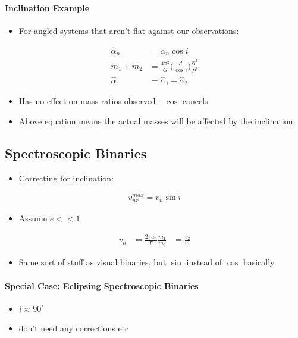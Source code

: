 \documentclass[a4paper,11pt,normalem]{article}
\begin{document}
\paragraph{Inclination Example}
\begin{itemize}
    \item For angled systems that aren't flat against our observations:
\end{itemize}
\begin{align}
    \hat{\alpha}_n &= \alpha_n \cos i\\
    m_1 + m_2 &= \frac{4\pi^2}{G} \Big(\frac{d}{\cos i}\Big)\frac{\hat{\alpha}^3}{P^2}\\
    \hat{\alpha} &= \hat{\alpha}_1 + \hat{\alpha}_2
\end{align}
\begin{itemize}
    \item Has no effect on mass ratios observed - \(\cos\) cancels
    \item Above equation means the actual masses will be affected by the inclination
\end{itemize}

\subsection{Spectroscopic Binaries}
\begin{itemize}
\item Correcting for inclination:
\end{itemize}
\begin{align}
    v_{nr}^{max} = v_n \sin i
\end{align}
\begin{itemize}
    \item Assume \(e << 1\)
\end{itemize}
\begin{align}
    v_n &= \frac{2\pi a_n}{P}
    \frac{m_1}{m_2} &= \frac{v_2}{v_1}
\end{align}
\begin{itemize}
    \item Same sort of stuff as visual binaries, but \(\sin\) instead of \(\cos\) basically
\end{itemize}

\paragraph{Special Case: Eclipsing Spectroscopic Binaries}
\begin{itemize}
    \item \(i \approx 90^\circ\)
    \item don't need any corrections etc
\end{itemize}
\end{document}
